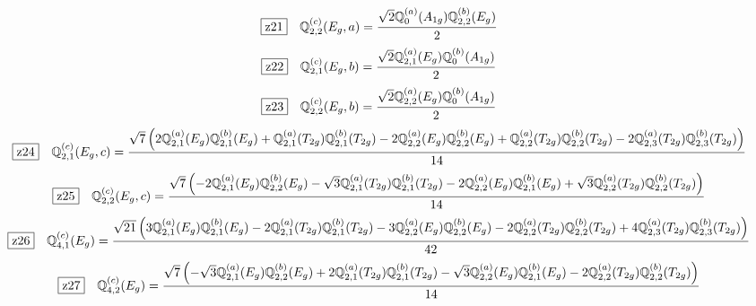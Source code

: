 \documentclass[fleqn,10pt,landscape]{jsarticle}
\begin{document}
\begin{dmath*}
\hspace*{3mm}\fbox{z21}\quad \mathbb{Q}_{2,2}^{(c)}(E_{g},a)=\frac{\sqrt{2} \mathbb{Q}_{0}^{(a)}(A_{1g}) \mathbb{Q}_{2,2}^{(b)}(E_{g})}{2}
\end{dmath*}
\begin{dmath*}
\hspace*{3mm}\fbox{z22}\quad \mathbb{Q}_{2,1}^{(c)}(E_{g},b)=\frac{\sqrt{2} \mathbb{Q}_{2,1}^{(a)}(E_{g}) \mathbb{Q}_{0}^{(b)}(A_{1g})}{2}
\end{dmath*}
\begin{dmath*}
\hspace*{3mm}\fbox{z23}\quad \mathbb{Q}_{2,2}^{(c)}(E_{g},b)=\frac{\sqrt{2} \mathbb{Q}_{2,2}^{(a)}(E_{g}) \mathbb{Q}_{0}^{(b)}(A_{1g})}{2}
\end{dmath*}
\begin{dmath*}
\hspace*{3mm}\fbox{z24}\quad \mathbb{Q}_{2,1}^{(c)}(E_{g},c)=\frac{\sqrt{7} \left(2 \mathbb{Q}_{2,1}^{(a)}(E_{g}) \mathbb{Q}_{2,1}^{(b)}(E_{g}) + \mathbb{Q}_{2,1}^{(a)}(T_{2g}) \mathbb{Q}_{2,1}^{(b)}(T_{2g}) - 2 \mathbb{Q}_{2,2}^{(a)}(E_{g}) \mathbb{Q}_{2,2}^{(b)}(E_{g}) + \mathbb{Q}_{2,2}^{(a)}(T_{2g}) \mathbb{Q}_{2,2}^{(b)}(T_{2g}) - 2 \mathbb{Q}_{2,3}^{(a)}(T_{2g}) \mathbb{Q}_{2,3}^{(b)}(T_{2g})\right)}{14}
\end{dmath*}
\begin{dmath*}
\hspace*{3mm}\fbox{z25}\quad \mathbb{Q}_{2,2}^{(c)}(E_{g},c)=\frac{\sqrt{7} \left(- 2 \mathbb{Q}_{2,1}^{(a)}(E_{g}) \mathbb{Q}_{2,2}^{(b)}(E_{g}) - \sqrt{3} \mathbb{Q}_{2,1}^{(a)}(T_{2g}) \mathbb{Q}_{2,1}^{(b)}(T_{2g}) - 2 \mathbb{Q}_{2,2}^{(a)}(E_{g}) \mathbb{Q}_{2,1}^{(b)}(E_{g}) + \sqrt{3} \mathbb{Q}_{2,2}^{(a)}(T_{2g}) \mathbb{Q}_{2,2}^{(b)}(T_{2g})\right)}{14}
\end{dmath*}
\begin{dmath*}
\hspace*{3mm}\fbox{z26}\quad \mathbb{Q}_{4,1}^{(c)}(E_{g})=\frac{\sqrt{21} \left(3 \mathbb{Q}_{2,1}^{(a)}(E_{g}) \mathbb{Q}_{2,1}^{(b)}(E_{g}) - 2 \mathbb{Q}_{2,1}^{(a)}(T_{2g}) \mathbb{Q}_{2,1}^{(b)}(T_{2g}) - 3 \mathbb{Q}_{2,2}^{(a)}(E_{g}) \mathbb{Q}_{2,2}^{(b)}(E_{g}) - 2 \mathbb{Q}_{2,2}^{(a)}(T_{2g}) \mathbb{Q}_{2,2}^{(b)}(T_{2g}) + 4 \mathbb{Q}_{2,3}^{(a)}(T_{2g}) \mathbb{Q}_{2,3}^{(b)}(T_{2g})\right)}{42}
\end{dmath*}
\begin{dmath*}
\hspace*{3mm}\fbox{z27}\quad \mathbb{Q}_{4,2}^{(c)}(E_{g})=\frac{\sqrt{7} \left(- \sqrt{3} \mathbb{Q}_{2,1}^{(a)}(E_{g}) \mathbb{Q}_{2,2}^{(b)}(E_{g}) + 2 \mathbb{Q}_{2,1}^{(a)}(T_{2g}) \mathbb{Q}_{2,1}^{(b)}(T_{2g}) - \sqrt{3} \mathbb{Q}_{2,2}^{(a)}(E_{g}) \mathbb{Q}_{2,1}^{(b)}(E_{g}) - 2 \mathbb{Q}_{2,2}^{(a)}(T_{2g}) \mathbb{Q}_{2,2}^{(b)}(T_{2g})\right)}{14}
\end{dmath*}
\end{document}
